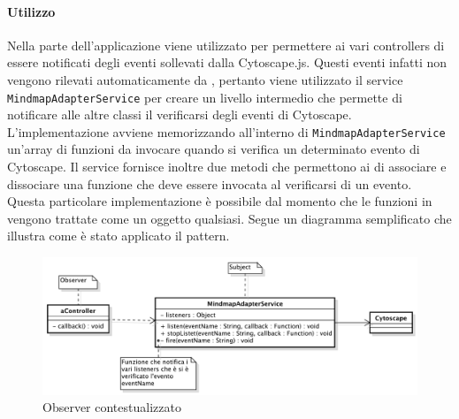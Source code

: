 \paragraph{Utilizzo}
Nella parte  dell'applicazione viene utilizzato per permettere ai vari controllers di essere notificati degli eventi sollevati dalla  Cytoscape.js. Questi eventi infatti non vengono rilevati automaticamente da , pertanto viene utilizzato il service \texttt{MindmapAdapterService} per creare un livello intermedio che permette di notificare alle altre classi il verificarsi degli eventi di Cytoscape.
L'implementazione avviene memorizzando all'interno di \texttt{MindmapAdapterService} un'array di funzioni da invocare quando si verifica un determinato evento di Cytoscape. Il service fornisce inoltre due metodi che permettono ai  di associare e dissociare una funzione che deve essere invocata al verificarsi di un evento.
Questa particolare implementazione è possibile dal momento che le funzioni in  vengono trattate come un oggetto qualsiasi.
Segue un diagramma semplificato che illustra come è stato applicato il pattern.\\
\begin{center}
\begin{figure}[h]
\centering
\includegraphics[scale=0.33,keepaspectratio]{diagrammi/designPatterns/observer.pdf}
\caption{Observer contestualizzato}
\end{figure}
\FloatBarrier
\end{center}
